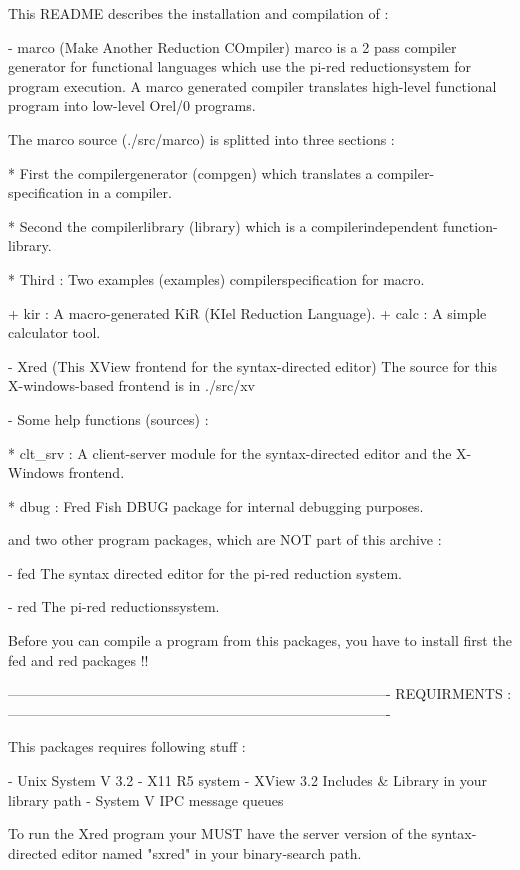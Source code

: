 
This README describes the installation and compilation of :

 - marco (Make Another Reduction COmpiler)
   marco is a 2 pass compiler generator for functional languages which use
   the pi-red reductionsystem for program execution. A marco generated compiler
   translates high-level functional program into low-level Orel/0 programs.

   The marco source (./src/marco) is splitted into three sections :
   
    * First the compilergenerator (compgen) which translates a compiler-
      specification in a compiler.

    * Second the compilerlibrary (library) which is a compilerindependent function-
      library.

    * Third : Two examples (examples) compilerspecification for macro.

      + kir  : A macro-generated KiR (KIel Reduction Language).
      + calc : A simple calculator tool.

 - Xred (This XView frontend for the syntax-directed editor)
   The source for this X-windows-based frontend is in ./src/xv

 - Some help functions (sources) :

   * clt_srv : A client-server module for the syntax-directed editor and the
     X-Windows frontend.

   * dbug : Fred Fish DBUG package for internal debugging purposes.

and two other program packages, which are NOT part of this archive :

 - fed
   The syntax directed editor for the pi-red reduction system.

 - red
   The pi-red reductionssystem.

Before you can compile a program from this packages, you have to 
install first the fed and red packages !!

----------------------------------------------------------------------------------
REQUIRMENTS :
----------------------------------------------------------------------------------

This packages requires following stuff :

 - Unix System V 3.2
 - X11 R5 system
 - XView 3.2 Includes & Library in your library path
 - System V IPC message queues

To run the Xred program your MUST have the server version of the syntax-directed
editor named "sxred" in your binary-search path.

